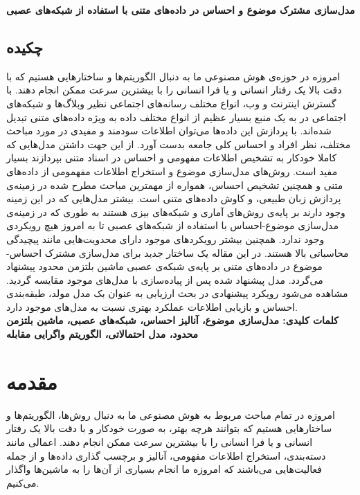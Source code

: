 \documentclass[12pt,a4paper]{article}
\begin{document}
\begin{center}
	{\Large \textbf{مدل‌سازی مشترک موضوع و احساس در داده‌های متنی با استفاده از شبکه‌های عصبی}}\\
\end{center}

	
\subsection*{چکیده}
\begin{small}
	\baselineskip=0.7cm
	امروزه در حوزه‌ی هوش مصنوعی ما به دنبال الگوریتم‌ها و ساختارهایی هستیم که با دقت بالا یک  رفتار انسانی‌ و یا فرا انسانی‌ را با بیشترین سرعت ممکن انجام دهند. با گسترش اینترنت و وب، انواع مختلف رسانه‌های اجتماعی نظیر وبلاگ‌ها و شبکه‌های اجتماعی در به یک منبع بسیار عظیم از انواع مختلف داده به ویژه داده‌‌های  متنی تبدیل شده‌اند. با پردازش این داده‌ها می‌‌توان اطلاعات سودمند و مفیدی در مورد مباحث مختلف، نظر افراد و احساس کلی‌ جامعه بدست آورد. از این جهت داشتن مدل‌هایی که کاملا خودکار به تشخیص اطلاعات مفهومی‌ و احساس در اسناد متنی بپردازند بسیار مفید است. روش‌های مدل‌سازی موضوع و استخراج اطلاعات مفهمومی از داده‌های متنی و همچنین تشخیص احساس، همواره از مهمترین مباحث مطرح شده در زمینه‌ی پردازش زبان طبیعی، و کاوش داده‌های متنی است. بیشتر مدل‌هایی که در این زمینه وجود دارند بر پایه‌ی روش‌های آماری و شبکه‌های بیزی هستند به طوری که در زمینه‌ی مدل‌سازی موضوع-احساس با استفاده از شبکه‌های عصبی تا به امروز هیچ رویکردی وجود ندارد. همچنین بیشتر رویکردهای موجود دارای محدویت‌هایی مانند پیچیدگی محاسباتی بالا هستند. در این مقاله یک ساختار جدید برای مدل‌سازی مشترک احساس-موضوع در داده‌های متنی بر پایه‌ی شبکه‌‌ی عصبی ماشین بلتزمن محدود پیشنهاد می‌‌گردد. مدل پیشنهاد شده پس از پیاده‌سازی با مدل‌های موجود مقایسه گردید. مشاهده می‌شود رویکرد پیشنهادی در بحث ارزیابی به عنوان بک مدل مولد، طبقه‌بندی احساس و بازیابی اطلاعات عملکرد بهتری نسبت به مدل‌های موجود دارد.\\
	\noindent\textbf{کلمات کلیدی: مدل‌سازی موضوع، آنالیز احساس، شبکه‌ها‌ی عصبی، ماشین بلتزمن محدود، مدل احتمالاتی، الگوریتم واگرایی مقابله}
\end{small} 


\section{مقدمه}
\label{sec1}

امروزه در تمام مباحث مربوط به هوش مصنوعی ما به دنبال روش‌ها، الگوریتم‌ها و ساختارهایی هستیم که بتوانند هرچه بهتر، به صورت خودکار و با دقت بالا یک  رفتار انسانی‌ و یا فرا انسانی‌ را با بیشترین سرعت ممکن انجام دهند. اعمالی مانند دسته‌بندی، استخراج اطلاعات مفهومی، آنالیز و برچسب گذاری داده‌ها و از جمله فعالیت‌هایی‌ می‌‌باشند که امروزه ما انجام بسیاری از آن‌ها را به ماشین‌ها واگذار می‌‌کنیم. 
\end{document}
